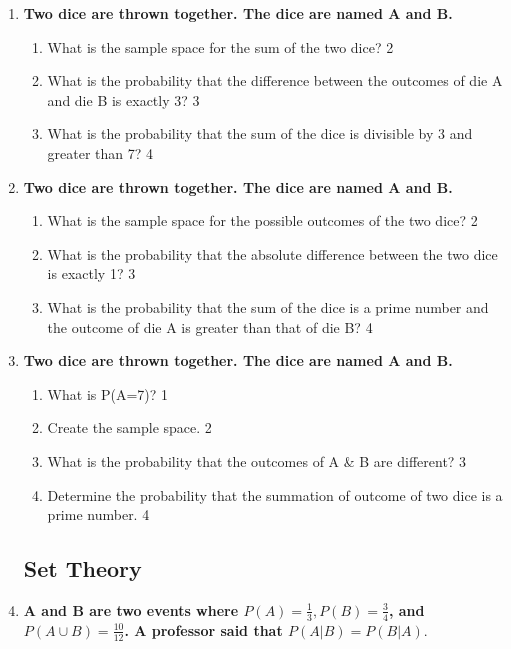 \documentclass[a4paper,oneside, margin=1.4in]{book}
\begin{document}
\begin{enumerate}
  \item  
  \textbf{Two dice are thrown together. The dice are named A and B.}  

  \begin{enumerate}  
    \item  
    	What is the sample space for the sum of the two dice? \hfill 2  
    \item  
    	What is the probability that the difference between the outcomes of die A and die B is exactly 3? \hfill 3  
    \item  
    	What is the probability that the sum of the dice is divisible by 3 and greater than 7? \hfill 4  
  \end{enumerate}  

  
  \item  
  \textbf{Two dice are thrown together. The dice are named A and B.}  

  \begin{enumerate}  
    \item  
    	What is the sample space for the possible outcomes of the two dice? \hfill 2  
    \item  
    	What is the probability that the absolute difference between the two dice is exactly 1? \hfill 3  
    \item  
    	What is the probability that the sum of the dice is a prime number and the outcome of die A is greater than that of die B? \hfill 4  
  \end{enumerate}  


 \item
	  \textbf{Two dice are thrown together. The dice are named A and B.} 
  
  \begin{enumerate}
    \item
	What is P(A=7)? \hfill 1
    \item
	Create the sample space. \hfill 2
    \item  
	What is the probability that the outcomes of A \& B are different? \hfill 3
    \item
	Determine the probability that the summation of outcome of two dice is a prime number. \hfill 4
  \end{enumerate}


\subsection{Set Theory}

  \item
	  \textbf{A and B are two events where $P(A) = \frac 13, P(B) = \frac 34$, and $P(A\cup B) = \frac{10}{12}$. A professor said that $P(A|B) = P(B|A)$}. 
  

\end{enumerate}
\end{document}
